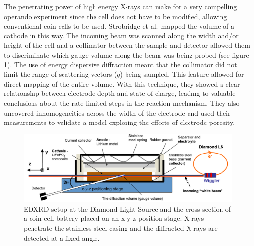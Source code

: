 \documentclass[journal=cmatex,manuscript=perspective]{achemso}
\begin{document}
The penetrating power of high energy X-rays can make for a very
compelling operando experiment since the cell does not have to be
modified, allowing conventional coin cells to be used. Strobridge et
al.\ mapped the volume of a  cathode in this
way\cite{strobridge2015}. The incoming beam was scanned along the
width and/or height of the cell and a collimator between the sample
and detector allowed them to discriminate which gauge volume along the
beam was being probed (see figure \ref{figure:strobridge2015}). The
use of energy dispersive diffraction meant that the collimator did not
limit the range of scattering vectors ($q$) being sampled. This
feature allowed for direct mapping of the entire volume. With this
technique, they showed a clear relationship between electrode depth
and state of charge, leading to valuable conclusions about the
rate-limited steps in the reaction mechanism. They also uncovered
inhomogeneities across the width of the electrode and used their
measurements to validate a model exploring the effects of electrode
porosity.

\begin{figure}
  \includegraphics[width=\textwidth]{strobridge2015.png}
  \caption{ EDXRD setup at the Diamond Light Source and the
    cross section of a coin-cell battery placed on an x-y-z position
    stage. X-rays penetrate the stainless steel casing and the
    diffracted X-rays are detected at a fixed angle.\cite{strobridge2015}}
  \label{figure:strobridge2015}
\end{figure}
\end{document}
